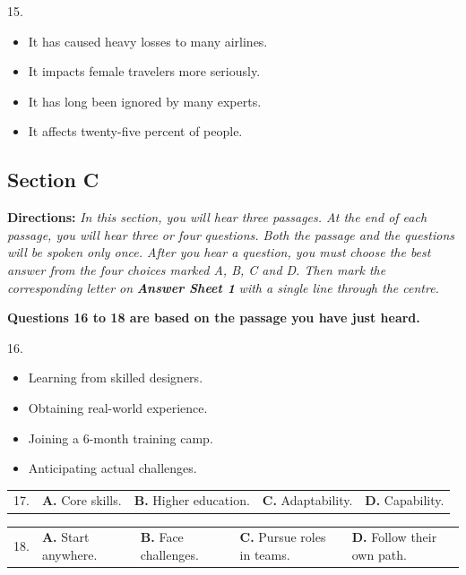 \documentclass[UTF8,11pt]{ctexart}
\begin{document}
15.


\begin{itemize}[leftmargin=2em,itemsep=.2em,topsep=.4em]\item[A.] It has caused heavy losses to many airlines.
\item[B.] It impacts female travelers more seriously.
\item[C.] It has long been ignored by many experts.
\item[D.] It affects twenty-five percent of people.
\end{itemize}

\subsection*{\textbf{Section C}}


\textbf{Directions:}\textit{ In this section, you will hear three passages. At the end of each passage, you will hear three or four} \textit{questions. Both the passage and the questions will be spoken only once. After you hear a question, you must} \textit{choose the best answer from the four choices marked A, B, C and D. Then mark the corresponding letter on} \textbf{\textit{Answer Sheet 1}}\textit{ with a single line through the centre.}


\textbf{Questions 16 to 18 are based on the passage you have just heard.}


16.


\begin{itemize}[leftmargin=2em,itemsep=.2em,topsep=.4em]\item[A.] Learning from skilled designers.
\item[B.] Obtaining real-world experience.
\item[C.] Joining a 6-month training camp.
\item[D.] Anticipating actual challenges.
\end{itemize}

\noindent\begin{tabularx}{\linewidth}{@{}lXXXX@{}}17. & \textbf{A.} Core skills. & \textbf{B.} Higher education. & \textbf{C.} Adaptability. & \textbf{D.} Capability.\\\end{tabularx}\par

\noindent\begin{tabularx}{\linewidth}{@{}lXXXX@{}}18. & \textbf{A.} Start anywhere. & \textbf{B.} Face challenges. & \textbf{C.} Pursue roles in teams. & \textbf{D.} Follow their own path.\\\end{tabularx}\par
\end{document}
